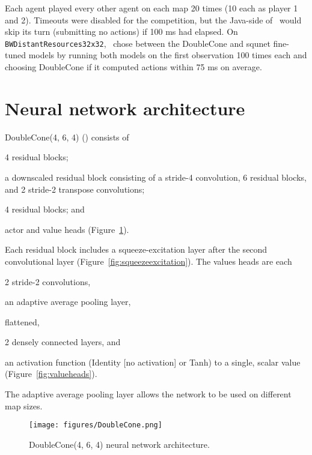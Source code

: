\documentclass{article}
\begin{document}
Each agent played every other agent on each map 20 times (10 each as player 1 and 2).
Timeouts were disabled for the competition, but the Java-side of \agentName\ would skip
its turn (submitting no actions) if 100 ms had elapsed. On
\texttt{BWDistantResources32x32}, \agentName\ chose between the DoubleCone and squnet
fine-tuned models by running both models on the first observation 100 times each and
choosing DoubleCone if it computed actions within 75 ms on average.


\section{Neural network architecture}
\label{appendix:architecture}
DoubleCone(4, 6, 4) (\citep{Ferdinand2021doublecone}) consists of
\begin{inparaenum}[(1)]
    \item 4 residual blocks;
    \item a downscaled residual block consisting of a stride-4 convolution, 6 residual blocks, and
        2 stride-2 transpose convolutions;
    \item 4 residual blocks; and
    \item actor and value heads (Figure~\ref{fig:doublecone}).
\end{inparaenum}
Each residual block includes a squeeze-excitation layer after the second convolutional
layer (Figure~\ref{fig:squeezeexcitation}).  The values heads are each 
\begin{inparaenum}[(1)]
    \item 2 stride-2 convolutions,
    \item an adaptive average pooling layer,
    \item flattened,
    \item 2 densely connected layers, and
    \item an activation function (Identity [no activation] or Tanh) to a single, scalar value (Figure~\ref{fig:valueheads}).
\end{inparaenum}
The adaptive average pooling layer allows the network to be used on different map sizes.

\begin{figure}[H]
    \begin{center}
        \texttt{[image: figures/DoubleCone.png]}
    \end{center}
    \caption{DoubleCone(4, 6, 4) neural network architecture.}
    \label{fig:doublecone}
\end{figure}
\end{document}
